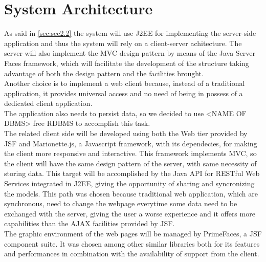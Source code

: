 \section{System Architecture} \label{sec:sec2.3}
As said in \autoref{sec:sec2.2} the system will use J2EE for implementing the server-side application and thus the system will rely on a client-server achitecture. The server will also implement the MVC design pattern by means of the Java Server Faces framework, which will facilitate the development of the structure taking advantage of both the design pattern and the facilities brought.\\
Another choice is to implement a web client because, instead of a traditional application, it provides universal access and no need of being in possess of a dedicated client application.\\
The application also needs to persist data, so we decided to use <NAME OF DBMS> free RDBMS to accomplish this task.\\
The related client side will be developed using both the Web tier provided by JSF and Marionette.js, a Javascript framework, with its dependecies, for making the client more responsive and interactive. This framework implements MVC, so the client will have the same design pattern of the server, with same necessity of storing data. This target will be accomplished by the Java API for RESTful Web Services integrated in J2EE, giving the opportunity of sharing and syncronizing the models. This path was chosen because traditional web application, which are synchronous, need to change the webpage everytime some data need to be exchanged with the server, giving the user a worse experience\cite{4} and it offers more capabilities than the AJAX facilities provided by JSF.\\
The graphic environment of the web pages will be managed by PrimeFaces, a JSF component suite. It was chosen among other similar libraries both for its features and performances in combination with the availability of support from the client.